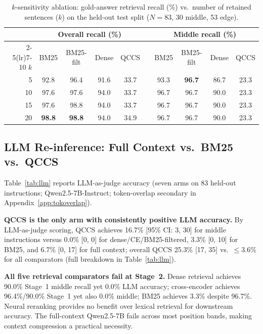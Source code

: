 \documentclass{article}
\begin{document}
\begin{table}[t]
\centering
\caption{$k$-sensitivity ablation: gold-answer retrieval recall (\%) vs.\ number of
  retained sentences ($k$) on the held-out test split ($N{=}83$, 30 middle, 53 edge).}
\label{tab:ablation_k}
\small
\setlength{\tabcolsep}{4pt}
\begin{tabular}{@{}rcccc ccccc@{}}
\toprule
 & \multicolumn{4}{c}{Overall recall (\%)} & & \multicolumn{4}{c}{Middle recall (\%)} \\
\cmidrule(lr){2-5}\cmidrule(lr){7-10}
$k$ & BM25 & BM25-filt & Dense & QCCS && BM25 & BM25-filt & Dense & QCCS \\
\midrule
 5 & 92.8 & 96.4 & 91.6 & 33.7 && 93.3 & \textbf{96.7} & 86.7 & 23.3 \\
10 & 97.6 & 97.6 & 94.0 & 33.7 && 96.7 & 96.7 & 90.0 & 23.3 \\
15 & 97.6 & 98.8 & 94.0 & 33.7 && 96.7 & 96.7 & 90.0 & 23.3 \\
20 & \textbf{98.8} & \textbf{98.8} & 94.0 & 34.9 && 96.7 & 96.7 & 90.0 & 23.3 \\
\bottomrule
\end{tabular}
\end{table}


\subsection{LLM Re-inference: Full Context vs.\ BM25 vs.\ QCCS}
\label{sec:condacc}

Table~\ref{tab:llm} reports LLM-as-judge accuracy (seven arms on 83 held-out
instructions; Qwen2.5-7B-Instruct; token-overlap secondary in Appendix~\ref{app:tokoverlap}).

\textbf{QCCS is the only arm with consistently positive LLM accuracy.}
By LLM-as-judge scoring, QCCS achieves 16.7\% [95\% CI: 3, 30] for middle
instructions versus 0.0\% [0, 0] for dense/CE/BM25-filtered, 3.3\% [0, 10]
for BM25, and 6.7\% [0, 17] for full context; overall QCCS 25.3\% [17, 35]
vs.\ $\leq$3.6\% for all comparators (full breakdown in Table~\ref{tab:llm}).

\textbf{All five retrieval comparators fail at Stage~2.}
Dense retrieval achieves 90.0\% Stage~1 middle recall yet 0.0\% LLM accuracy;
cross-encoder achieves 96.4\%/90.0\% Stage~1 yet also 0.0\% middle; BM25
achieves 3.3\% despite 96.7\%. Neural reranking provides no benefit over lexical
retrieval for downstream accuracy. The full-context Qwen2.5-7B fails across
most position bands, making context compression a practical necessity.
\end{document}

